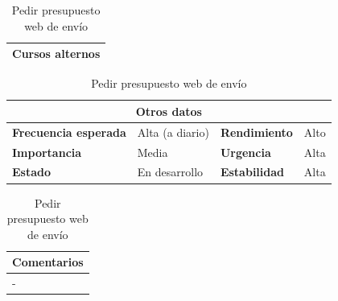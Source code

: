 \documentclass[12pt,spanish]{article}
\begin{document}
\begin{table}[H]
\vspace{1cm}

\begin{tabular}{|m{10pt}|m{7.15cm}|m{10pt}|m{7.15cm}|}
\hline
\multicolumn{4}{|m{16.2cm}|}{\textbf{Cursos alternos}} \\
\hline
\end{tabular}

\vspace{1cm}

\begin{tabular}{|m{3.72cm}|m{3.72cm}|m{3.72cm}|m{3.72cm}|}
\hline
\multicolumn{4}{|c|}{\textbf{Otros datos}} \\
\hline
\textbf{Frecuencia esperada} & Alta (a diario) & \textbf{Rendimiento} & Alto \\
\hline
\textbf{Importancia} & Media & \textbf{Urgencia} & Alta \\
\hline
\textbf{Estado} & En desarrollo & \textbf{Estabilidad} & Alta \\
\hline
\end{tabular}

\vspace{1cm}

\begin{tabular}{|m{16.2cm}|}
\hline
\textbf{Comentarios} \\
\hline
- \\
\hline
\end{tabular}

\caption{Pedir presupuesto web de envío}

\end{table}

\end{document}
